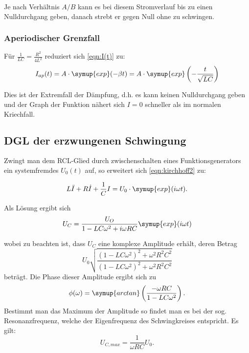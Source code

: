 Je nach Verhältnis $A/B$ kann es bei diesem Stromverlauf bis zu einen Nulldurchgang geben, danach strebt er gegen Null ohne zu schwingen.

\subsubsection{Aperiodischer Grenzfall}
Für $\frac{1}{LC} = \frac{R^2}{4L^2}$ reduziert sich \eqref{eqn:I(t)} zu:
\begin{equation}
  I_{ap}(t)= A \cdot \symup{exp}(-\beta t) = A \cdot \symup{exp}\left(- \frac{t}{\sqrt{LC}}\right)
  \label{eqn:AP(t)}
\end{equation}

Dies ist der Extremfall der Dämpfung, d.h. es kann keinen Nulldurchgang geben und der Graph der Funktion nähert sich $I=0$ schneller als im normalen Kriechfall.

\subsection{DGL der erzwungenen Schwingung}
Zwingt man dem RCL-Glied durch zwischenschalten eines Funktionsgenerators ein systemfremdes $U_0(t)$ auf, so erweitert sich \eqref{eqn:kirchhoff2} zu:

\begin{equation}
  L \ddot{I} + R \dot{I} + \frac{1}{C} I = U_0 \cdot \symup{exp}(i \omega t).
\end{equation}

Als Lösung ergibt sich
\begin{equation}
  U_C = \frac{U_O}{1-LC \omega^2 + i\omega RC} \symup{exp}(i\omega t)
  \label{eqn:U_C}
\end{equation}

wobei zu beachten ist, dass $U_C$ eine komplexe Amplitude erhält, deren Betrag
\begin{equation*}
U_0 \sqrt{\frac{(1-LC\omega^2)^2+\omega^2 R^2 C^2}{(1-LC\omega^2)^2 + \omega^2 R^2 C^2}}
\end{equation*}
beträgt.
Die Phase dieser Amplitude ergibt sich zu
\begin{equation*}
\phi(\omega)=\symup{arctan}\left(\frac{-\omega RC}{1-LC\omega^2}\right).
\end{equation*}
Bestimmt man das Maximum der Amplitude so findet man es bei der sog. Resonanzfrequenz, welche der Eigenfrequenz \omega des Schwingkreises entspricht. Es gilt:
\begin{equation}
  U_{C,max} = \frac{1}{\omega RC} U_0.
  \label{eqn:Resonanz}
\end{equation}

